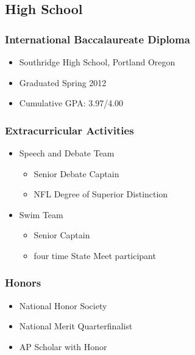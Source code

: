\documentclass[12pt]{article}
\begin{document}
\subsection{High School}

\subsubsection{International Baccalaureate Diploma}

\begin{itemize}
    \item{Southridge High School, Portland Oregon}
    \item{Graduated Spring 2012}
    \item{Cumulative GPA: 3.97/4.00}
\end{itemize}





\subsubsection{Extracurricular Activities}

\begin{itemize}

    \item{Speech and Debate Team}
    \begin{itemize}
        \item{Senior Debate Captain}
        \item{NFL Degree of Superior Distinction}
    \end{itemize}

    \item{Swim Team}
    \begin{itemize}
        \item{Senior Captain}
        \item{four time State Meet participant}
    \end{itemize}

\end{itemize}





\subsubsection{Honors}

\begin{itemize}
    \item{National Honor Society}
    \item{National Merit Quarterfinalist}
    \item{AP Scholar with Honor}
\end{itemize}
\end{document}
